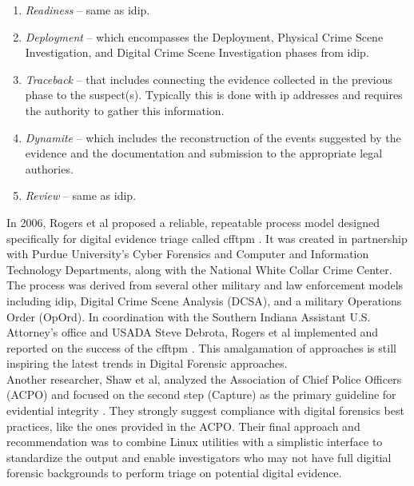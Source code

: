 \documentclass[12pt]{article}
\begin{document}
\vspace{0.5 cm}
\begin{enumerate}
  \item {\em Readiness} -- same as \gls{idip}.
  \item {\em Deployment} -- which encompasses the Deployment,
  Physical Crime Scene Investigation, and Digital Crime Scene
  Investigation phases from \gls{idip}.
  \item {\em Traceback} -- that includes connecting the evidence collected
  in the previous phase to the suspect(s).  Typically this is done with \gls{ip}
  addresses and requires the authority to gather this information.
  \item {\em Dynamite} -- which includes the reconstruction of the events
  suggested by the evidence and the documentation and submission to the
  appropriate legal authories.
  \item {\em Review} -- same as \gls{idip}.
\end{enumerate}
\vspace{0.5 cm}

In 2006, Rogers et al proposed a reliable, repeatable process 
model designed specifically for digital evidence triage called
\gls{cfftpm} \cite{rogers2006computer}. It was created in partnership
with Purdue University's Cyber Forensics and Computer and Information
Technology Departments, along with the National White Collar Crime
Center. The process was derived from several other military and law enforcement models
including \gls{idip}, Digital Crime Scene Analysis (DCSA),
and a military Operations Order (OpOrd).  In coordination with the Southern Indiana 
Assistant U.S. Attorney's office and 
USADA Steve Debrota, Rogers et al implemented and reported
on the success of the \gls{cfftpm} \cite{rogers2006computer}.  This amalgamation of approaches is still inspiring 
the latest trends in Digital Forensic approaches.\\

Another researcher, Shaw et al, analyzed the Association of Chief Police Officers (ACPO)
and focused on the second step (Capture) as the primary guideline for evidential
integrity \cite{shaw2013practical}.  They strongly suggest compliance with
digital forensics best practices, like the ones provided in the ACPO.  Their final approach
and recommendation was to combine Linux utilities with a simplistic interface to standardize
the output and enable investigators who may not have full digitial forensic backgrounds
to perform triage on potential digital evidence.\\
\end{document}
